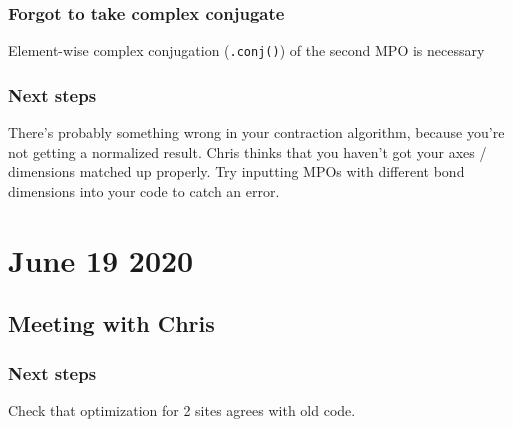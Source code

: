 \documentclass{report}
\begin{document}
\subsection{Forgot to take complex conjugate}

Element-wise complex conjugation (\lstinline{.conj()}) of the second MPO is necessary

\subsection{Next steps}

There's probably something wrong in your contraction algorithm, because you're not getting a normalized result. Chris thinks that you haven't got your axes / dimensions matched up properly. Try inputting MPOs with different bond dimensions into your code to catch an error.

\chapter{June 19 2020}

\section{Meeting with Chris}

\subsection{Next steps}

Check that optimization for 2 sites agrees with old code.


 

\end{document}
